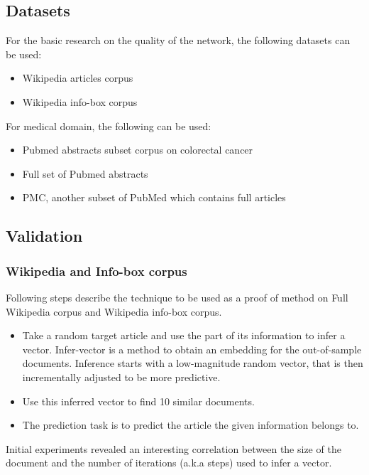 \documentclass[12pt,a4paper] {article}
\begin{document}
	
	\subsection*{Datasets}
	For the basic research on the quality of the network, the following datasets can 
	be used:
	\begin{itemize}
		\item Wikipedia articles corpus
		\item Wikipedia info-box corpus
	\end{itemize}
	
	For medical domain, the following can be used:
	\begin{itemize}
		\item Pubmed abstracts subset corpus on colorectal cancer
		\item Full set of Pubmed abstracts
		\item PMC, another subset of PubMed which contains full articles
	\end{itemize}
	
	
	\subsection*{Validation}
	
	\subsubsection*{Wikipedia and Info-box corpus}
	Following steps describe the technique to be used as a proof of method on Full Wikipedia corpus and Wikipedia info-box corpus. 
	
	\begin{itemize}
		
		
		
		\item Take a random target article and use the part of its information to infer a vector. Infer-vector is a method to obtain an embedding for the out-of-sample documents. Inference starts with a low-magnitude random vector, that is then incrementally adjusted to be more predictive.
		
		\item Use this inferred vector to find 10 similar documents.
		\item The prediction task is to predict the article the given information belongs to.
		
	\end{itemize}
	
	
	Initial experiments revealed an interesting correlation between the size of the document and the number of iterations (a.k.a steps)  used to infer a vector.
	
\end{document}
